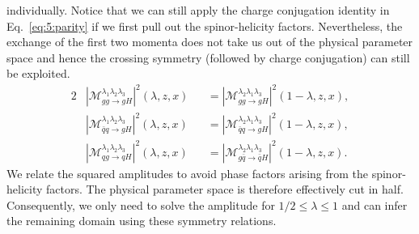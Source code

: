 individually. Notice that we can still apply the charge conjugation identity in Eq.~\eqref{eq:5:parity} if we first pull out the spinor-helicity factors. Nevertheless, the exchange of the first two momenta does not take us out of the physical parameter space and hence the crossing symmetry (followed by charge conjugation) can still be exploited.
\begin{alignat}{2}
& |\mathcal{M}_{gg \rightarrow g H}^{\lambda_1 \lambda_2 \lambda_3} |^2(\lambda, z, x) &&= |\mathcal{M}_{gg \rightarrow g H}^{\lambda_2 \lambda_1 \lambda_3}|^2 (1 - \lambda, z, x), \label{eq:5:symmetry_1} \\
& |\mathcal{M}_{\bar{q}q \rightarrow g H}^{\lambda_1 \lambda_2 \lambda_3}|^2 (\lambda , z, x) &&= |\mathcal{M}_{\bar{q} q \rightarrow g H}^{\lambda_2 \lambda_1 \lambda_3}|^2 (1 - \lambda , z, x),\label{eq:5:symmetry_2} \\
& |\mathcal{M}_{qg \rightarrow qH}^{\lambda_1 \lambda_2 \lambda_3}|^2 (\lambda, z, x) &&= |\mathcal{M}_{g \bar{q} \rightarrow \bar{q} H}^{\lambda_2 \lambda_1 \lambda_3}|^2 (1 - \lambda, z, x). \label{eq:5:symmetry_3}
\end{alignat}
We relate the squared amplitudes to avoid phase factors arising from the spinor-helicity factors. The physical parameter space is therefore effectively cut in half. Consequently, we only need to solve the amplitude for $1/2 \le \lambda \le 1$ and can infer the remaining domain using these symmetry relations.

